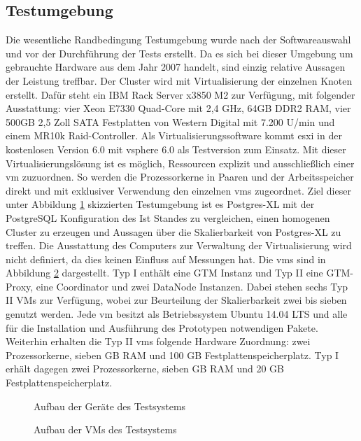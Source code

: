 \subsection{Testumgebung}
Die wesentliche Randbedingung Testumgebung wurde nach der Softwareauswahl und vor der Durchführung der Tests erstellt.
Da es sich bei dieser Umgebung um gebrauchte Hardware aus dem Jahr 2007 handelt, sind einzig relative Aussagen der Leistung treffbar.
Der Cluster wird mit Virtualisierung der einzelnen Knoten erstellt.
Dafür steht ein IBM Rack Server x3850 M2 zur Verfügung, mit folgender Ausstattung:
vier Xeon E7330 Quad-Core mit 2,4 GHz, 64GB DDR2 RAM, vier 500GB 2,5 Zoll SATA Festplatten von Western Digital mit 7.200 U/min und einem MR10k Raid-Controller.
Als Virtualisierungssoftware kommt \Gls{esxi} in der kostenlosen Version 6.0 mit \Gls{vsphere} 6.0 als Testversion zum Einsatz.
Mit dieser Virtualisierungslösung ist es möglich, Ressourcen explizit und ausschließlich einer \Gls{vm} zuzuordnen.
So werden die Prozessorkerne in Paaren und der Arbeitsspeicher direkt und mit exklusiver Verwendung den einzelnen \Gls{vm}s zugeordnet.
Ziel dieser unter Abbildung \ref{fig:physAufb} skizzierten Testumgebung ist es Postgres-XL mit der PostgreSQL Konfiguration des Ist Standes zu vergleichen, einen homogenen Cluster zu erzeugen und Aussagen über die Skalierbarkeit von Postgres-XL zu treffen.
Die Ausstattung des Computers zur Verwaltung der Virtualisierung wird nicht definiert, da dies keinen Einfluss auf Messungen hat.
Die \Gls{vm}s sind in Abbildung \ref{fig:VMAufb} dargestellt.
Typ I enthält eine GTM Instanz und Typ II eine GTM-Proxy, eine Coordinator und zwei DataNode Instanzen.
Dabei stehen sechs Typ II VMs zur Verfügung, wobei zur Beurteilung der Skalierbarkeit zwei bis sieben genutzt werden.
Jede \Gls{vm} besitzt als Betriebssystem Ubuntu 14.04 LTS und alle für die Installation und Ausführung des Prototypen notwendigen Pakete.
Weiterhin erhalten die Typ II \Gls{vm}s folgende Hardware Zuordnung:
zwei Prozessorkerne, sieben GB RAM und 100 GB Festplattenspeicherplatz.
Typ I erhält dagegen zwei Prozessorkerne, sieben GB RAM und 20 GB Festplattenspeicherplatz.
\begin{figure}[h!]
\centering

\caption[Aufbau der Geräte des Testsystems]{Aufbau der Geräte des Testsystems}
\label{fig:physAufb}
\end{figure}
\begin{figure}[h!]
\centering

\caption[Aufbau der VMs des Testsystems]{Aufbau der VMs des Testsystems}
\label{fig:VMAufb}
\end{figure}

